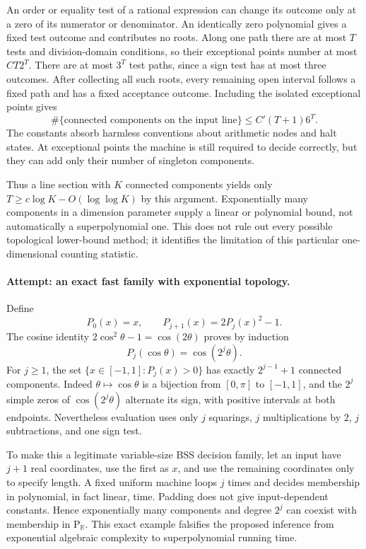 \documentclass[11pt,a4paper]{article}
\newcommand{\R}{\mathbb{R}}
\numberwithin{equation}{section}
\begin{document}
An order or equality test of a rational expression can change its outcome
only at a zero of its numerator or denominator. An identically zero
polynomial gives a fixed test outcome and contributes no roots. Along one
path there are at most $T$ tests and division-domain conditions, so their
exceptional points number at most $C T2^T$. There are at most $3^T$ test
paths, since a sign test has at most three outcomes. After collecting all
such roots, every remaining open interval follows a fixed path and has a
fixed acceptance outcome. Including the isolated exceptional points gives
\begin{equation}\label{eq172-components}
 \#\{\text{connected components on the input line}\}
                  \le C'(T+1)6^T.
\end{equation}
The constants absorb harmless conventions about arithmetic nodes and halt
states. At exceptional points the machine is still required to decide
correctly, but they can add only their number of singleton components.

Thus a line section with $K$ connected components yields only
$T\ge c\log K-O(\log\log K)$ by this argument. Exponentially many
components in a dimension parameter supply a linear or polynomial bound,
not automatically a superpolynomial one. This does not rule out every
possible topological lower-bound method; it identifies the limitation of
this particular one-dimensional counting statistic.

\paragraph{Attempt: an exact fast family with exponential topology.}
Define
\[
 P_0(x)=x,\qquad P_{j+1}(x)=2P_j(x)^2-1.
\]
The cosine identity $2\cos^2\theta-1=\cos(2\theta)$ proves by induction
\begin{equation}\label{eq172-chebyshev}
              P_j(\cos\theta)=\cos(2^j\theta).
\end{equation}
For $j\ge1$, the set
$\{x\in[-1,1]:P_j(x)>0\}$ has exactly $2^{j-1}+1$ connected components.
Indeed $\theta\mapsto\cos\theta$ is a bijection from $[0,\pi]$ to
$[-1,1]$, and the $2^j$ simple zeros of $\cos(2^j\theta)$ alternate its
sign, with positive intervals at both endpoints. Nevertheless evaluation
uses only $j$ squarings, $j$ multiplications by $2$, $j$ subtractions, and
one sign test.

To make this a legitimate variable-size BSS decision family, let an input
have $j+1$ real coordinates, use the first as $x$, and use the remaining
coordinates only to specify length. A fixed uniform machine loops $j$
times and decides membership in polynomial, in fact linear, time.
Padding does not give input-dependent constants. Hence exponentially many
components and degree $2^j$ can coexist with membership in $\mathrm P_{\R}$.
This exact example falsifies the proposed inference from exponential
algebraic complexity to superpolynomial running time.
\end{document}
